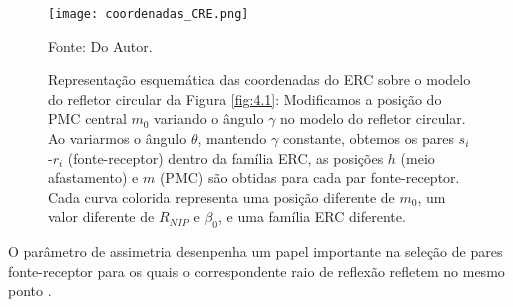 \begin{figure}[htb]
\caption{Representação esquemática das coordenadas do ERC sobre o modelo do refletor circular da Figura \ref{fig:4.1}:
Modificamos a posição do PMC central $m_0$ variando o ângulo $\gamma$ no modelo do refletor circular.
Ao variarmos o ângulo $\theta$, mantendo $\gamma$ constante, obtemos os pares $s_i$-$r_i$ (fonte-receptor)
dentro da família
ERC, as posições $h$ (meio afastamento) e $m$ (PMC) são obtidas para cada par fonte-receptor.
Cada curva colorida representa uma posição
diferente de $m_0$, um valor diferente de $R_{NIP}$ e $\beta_0$, e uma família ERC diferente.}
\begin{center}
\texttt{[image: coordenadas\_CRE.png]}
\vspace{-0.3cm}
\end{center}
\begin{center}
 Fonte: Do Autor.
\end{center}
\label{fig:4.2}
\end{figure}





O parâmetro de assimetria desenpenha um papel importante na seleção de pares fonte-receptor para os quais
o correspondente raio de reflexão refletem no mesmo ponto \cite{tygel}.





